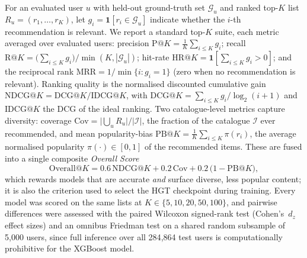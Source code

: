 For an evaluated user $u$ with held-out ground-truth set $\mathcal{G}_u$
and ranked top-$K$ list $R_u=(r_1,\dots,r_K)$, let
$g_i=\mathbf{1}[r_i\in\mathcal{G}_u]$ indicate whether the $i$-th
recommendation is relevant. We report a standard top-$K$ suite, each
metric averaged over evaluated users: precision
$\mathrm{P@}K=\tfrac{1}{K}\sum_{i\le K} g_i$; recall
$\mathrm{R@}K=\bigl(\sum_{i\le K} g_i\bigr)/\min(K,|\mathcal{G}_u|)$;
hit-rate $\mathrm{HR@}K=\mathbf{1}\!\left[\sum_{i\le K} g_i>0\right]$;
and the reciprocal rank $\mathrm{MRR}=1/\min\{i:g_i{=}1\}$ (zero when no
recommendation is relevant). Ranking quality is the normalised
discounted cumulative gain
$\mathrm{NDCG@}K=\mathrm{DCG@}K/\mathrm{IDCG@}K$, with
$\mathrm{DCG@}K=\sum_{i\le K} g_i/\log_2(i+1)$ and $\mathrm{IDCG@}K$ the
DCG of the ideal ranking. Two catalogue-level metrics capture diversity:
coverage $\mathrm{Cov}=\bigl|\bigcup_u R_u\bigr|/|\mathcal{I}|$, the
fraction of the catalogue $\mathcal{I}$ ever recommended, and mean
popularity-bias $\mathrm{PB@}K=\tfrac{1}{K}\sum_{i\le K}\pi(r_i)$, the
average normalised popularity $\pi(\cdot)\in[0,1]$ of the recommended
items. These are fused into a single composite \emph{Overall Score}
\begin{equation}\label{eq:overall}
\mathrm{Overall@}K = 0.6\,\mathrm{NDCG@}K + 0.2\,\mathrm{Cov}
+ 0.2\,\bigl(1-\mathrm{PB@}K\bigr),
\end{equation}
which rewards models that are accurate \emph{and} surface diverse, less
popular content; it is also the criterion used to select the HGT
checkpoint during training. Every model was scored on the same lists at
$K\in\{5,10,20,50,100\}$, and pairwise differences were assessed with the
paired Wilcoxon signed-rank test (Cohen's~$d_z$ effect sizes) and an
omnibus Friedman test on a shared random subsample of 5{,}000 users,
since full inference over all 284{,}864 test users is computationally
prohibitive for the XGBoost model.

